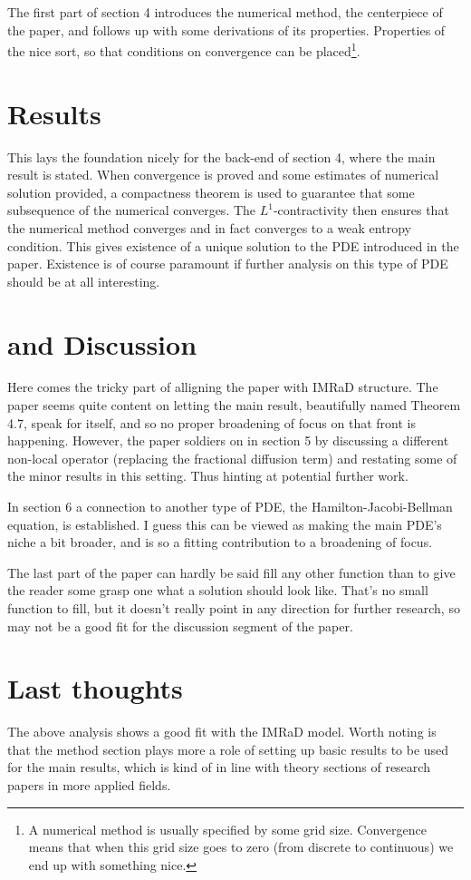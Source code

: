 \documentclass[11pt, a4paper]{article}
\begin{document}
The first part of section 4 introduces the numerical method, the centerpiece of the paper, and follows up with some derivations of its properties. Properties of the nice sort, so that  conditions on convergence can be placed\footnote{A numerical method is usually specified by some grid size. Convergence means that when this grid size goes to zero (from discrete to continuous) we end up with something nice.}. 

\section*{Results}
This lays the foundation nicely for the back-end of section 4, where the main result is stated. When convergence is proved and some estimates of numerical solution provided, a compactness theorem is used to guarantee that some subsequence of the numerical converges. The $L^1$-contractivity then ensures that the numerical method converges and in fact converges to a weak entropy condition. This gives existence of a unique solution to the PDE introduced in the paper. Existence is of course paramount if further analysis on this type of PDE should be at all interesting.

\section*{and Discussion}
Here comes the tricky part of alligning the paper with IMRaD structure. The paper seems quite content on letting the main result, beautifully named Theorem 4.7, speak for itself, and so no proper broadening of focus on that front is happening. However, the paper soldiers on in section 5 by discussing a different non-local operator (replacing the fractional diffusion term) and restating some of the minor results in this setting. Thus hinting at potential further work. 

In section 6 a connection to another type of PDE, the Hamilton-Jacobi-Bellman equation, is established. I guess this can be viewed as making the main PDE's niche a bit broader, and is so a fitting contribution to a broadening of focus.

The last part of the paper can hardly be said fill any other function than to give the reader some grasp one what a solution should look like. That's no small function to fill, but it doesn't really point in any direction for further research, so may not be a good fit for the discussion segment of the paper.


\section*{Last thoughts}
The above analysis shows a good fit with the IMRaD model. Worth noting is that the method section plays more a role of setting up basic results to be used for the main results, which is kind of in line with theory sections of research papers in more applied fields.
\end{document}
